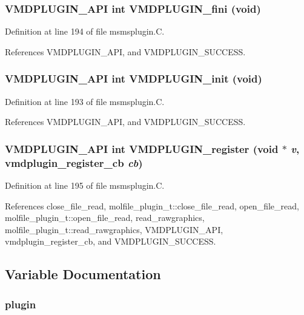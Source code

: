 \subsubsection{\setlength{\rightskip}{0pt plus 5cm}VMDPLUGIN\_\-API int VMDPLUGIN\_\-fini (void)}\label{msmsplugin_8C_a5}




Definition at line 194 of file msmsplugin.C.

References VMDPLUGIN\_\-API, and VMDPLUGIN\_\-SUCCESS.
\subsubsection{\setlength{\rightskip}{0pt plus 5cm}VMDPLUGIN\_\-API int VMDPLUGIN\_\-init (void)}\label{msmsplugin_8C_a4}




Definition at line 193 of file msmsplugin.C.

References VMDPLUGIN\_\-API, and VMDPLUGIN\_\-SUCCESS.
\subsubsection{\setlength{\rightskip}{0pt plus 5cm}VMDPLUGIN\_\-API int VMDPLUGIN\_\-register (void $\ast$ {\em v}, {\bf vmdplugin\_\-register\_\-cb} {\em cb})}\label{msmsplugin_8C_a6}




Definition at line 195 of file msmsplugin.C.

References close\_\-file\_\-read, molfile\_\-plugin\_\-t::close\_\-file\_\-read, open\_\-file\_\-read, molfile\_\-plugin\_\-t::open\_\-file\_\-read, read\_\-rawgraphics, molfile\_\-plugin\_\-t::read\_\-rawgraphics, VMDPLUGIN\_\-API, vmdplugin\_\-register\_\-cb, and VMDPLUGIN\_\-SUCCESS.

\subsection{Variable Documentation}
\subsubsection{ plugin\hspace{0.3cm}{\tt  [static]}}\label{msmsplugin_8C_a0}


